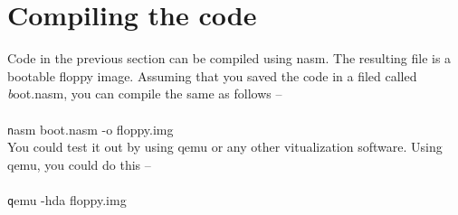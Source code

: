 \documentclass{article}
\begin{document}
\section*{Compiling the code} Code in the previous section can be compiled
using nasm. The resulting file is a bootable floppy image. Assuming that you saved the code in a filed called {\emph boot.nasm}, you can compile the same as follows --\\
	      \\
 {\texttt nasm boot.nasm -o floppy.img}
	      \\

You could test it out by using qemu or any other vitualization software. Using qemu, you could do this -- \\
	    \\
{\texttt qemu -hda floppy.img}
\end{document}
